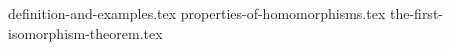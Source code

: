 \setcounter{chapter}{10}
\setcounter{section}{0}
{definition-and-examples.tex}
{properties-of-homomorphisms.tex}
{the-first-isomorphism-theorem.tex}
